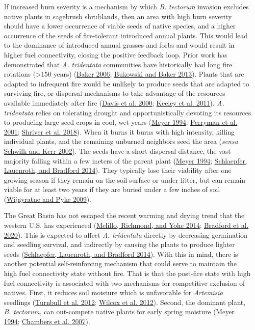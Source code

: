 \documentclass[
  12pt,
]{article}
\begin{document}
If increased burn severity is a mechanism by which \emph{B. tectorum}
invasion excludes native plants in sagebrush shrublands, then an area
with high burn severity should have a lower occurrence of viable seeds
of native species, and a higher occurrence of the seeds of fire-tolerant
introduced annual plants. This would lead to the dominance of introduced
annual grasses and forbs and would result in higher fuel connectivity,
closing the positive feedback loop. Prior work has demonstrated that
\emph{A. tridentata} communities have historically had long fire
rotations (\textgreater150 years)
(\protect\hyperlink{ref-Baker2006}{Baker 2006};
\protect\hyperlink{ref-Bukowski2013}{Bukowski and Baker 2013}). Plants
that are adapted to infrequent fire would be unlikely to produce seeds
that are adapted to surviving fire, or dispersal mechanisms to take
advantage of the resources available immediately after fire
(\protect\hyperlink{ref-Davis2000}{Davis et al. 2000};
\protect\hyperlink{ref-Keeley2011}{Keeley et al. 2011}). \emph{A.
tridentata} relies on tolerating drought and opportunistically devoting
its resources to producing large seed crops in cool, wet years
(\protect\hyperlink{ref-Meyer1994}{Meyer 1994};
\protect\hyperlink{ref-Perryman2001}{Perryman et al. 2001};
\protect\hyperlink{ref-Shriver2018}{Shriver et al. 2018}). When it burns
it burns with high intensity, killing individual plants, and the
remaining unburned neighbors seed the area (\emph{sensu}
\protect\hyperlink{ref-Schwilk2002}{Schwilk and Kerr 2002}). The seeds
have a short dispersal distance, the vast majority falling within a few
meters of the parent plant (\protect\hyperlink{ref-Meyer1994}{Meyer
1994}; \protect\hyperlink{ref-Schlaepfer2014}{Schlaepfer, Lauenroth, and
Bradford 2014}). They typically lose their viability after one growing
season if they remain on the soil surface or under litter, but can
remain viable for at least two years if they are buried under a few
inches of soil (\protect\hyperlink{ref-Wijayratne2009}{Wijayratne and
Pyke 2009}).

The Great Basin has not escaped the recent warming and drying trend that
the western U.S. has experienced
(\protect\hyperlink{ref-Melillo2014}{Melillo, Richmond, and Yohe 2014};
\protect\hyperlink{ref-Bradford2020}{Bradford et al. 2020}). This is
expected to affect \emph{A. tridentata} directly by decreasing
germination and seedling survival, and indirectly by causing the plants
to produce lighter seeds
(\protect\hyperlink{ref-Schlaepfer2014}{Schlaepfer, Lauenroth, and
Bradford 2014}). With this in mind, there is another potential
self-reinforcing mechanism that could serve to maintain the high fuel
connectivity state without fire. That is that the post-fire state with
high fuel connectivity is associated with two mechanisms for competitive
exclusion of natives. First, it reduces soil moisture which is
unfavorable for \emph{Artemisia} seedlings
(\protect\hyperlink{ref-Turnbull2012}{Turnbull et al. 2012};
\protect\hyperlink{ref-Wilcox2012}{Wilcox et al. 2012}). Second, the
dominant plant, \emph{B. tectorum}, can out-compete native plants for
early spring moisture (\protect\hyperlink{ref-Meyer1994}{Meyer 1994};
\protect\hyperlink{ref-Chambers2007}{Chambers et al. 2007}).
\end{document}
